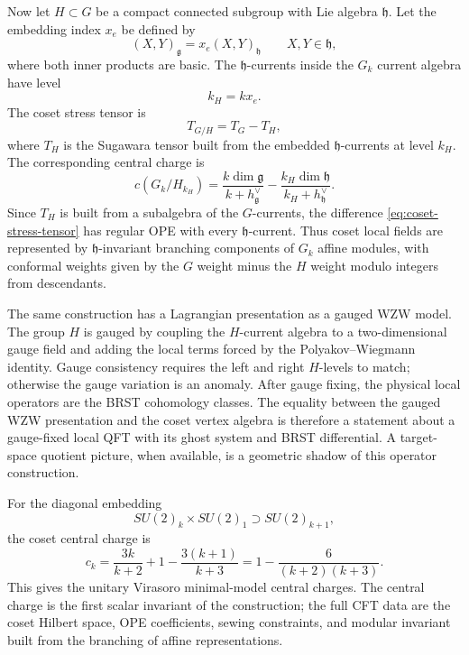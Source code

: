 Now let \(H\subset G\) be a compact connected subgroup with Lie algebra
\(\mathfrak h\).  Let the embedding index \(x_e\) be defined by
\[
  (X,Y)_{\mathfrak g}=x_e(X,Y)_{\mathfrak h}
  \qquad X,Y\in\mathfrak h,
\]
where both inner products are basic.  The \(\mathfrak h\)-currents inside
the \(G_k\) current algebra have level
\[
  k_H=kx_e .
\]
The coset stress tensor is
\begin{equation}
  T_{G/H}
  =
  T_G-T_H,
  \label{eq:coset-stress-tensor}
\end{equation}
where \(T_H\) is the Sugawara tensor built from the embedded
\(\mathfrak h\)-currents at level \(k_H\).  The corresponding central charge
is
\begin{equation}
  c(G_k/H_{k_H})
  =
  \frac{k\dim\mathfrak g}{k+h^\vee_{\mathfrak g}}
  -
  \frac{k_H\dim\mathfrak h}{k_H+h^\vee_{\mathfrak h}} .
  \label{eq:coset-central-charge}
\end{equation}
Since \(T_H\) is built from a subalgebra of the \(G\)-currents, the
difference \eqref{eq:coset-stress-tensor} has regular OPE with every
\(\mathfrak h\)-current.  Thus coset local fields are represented by
\(\mathfrak h\)-invariant branching components of \(G_k\) affine modules,
with conformal weights given by the \(G\) weight minus the \(H\) weight
modulo integers from descendants.

The same construction has a Lagrangian presentation as a gauged WZW model.
The group \(H\) is gauged by coupling the \(H\)-current algebra to a
two-dimensional gauge field and adding the local terms forced by the
Polyakov--Wiegmann identity.  Gauge consistency requires the left and right
\(H\)-levels to match; otherwise the gauge variation is an anomaly.  After
gauge fixing, the physical local operators are the BRST cohomology classes.
The equality between the gauged WZW presentation and the coset vertex
algebra is therefore a statement about a gauge-fixed local QFT with its
ghost system and BRST differential.  A target-space quotient picture, when
available, is a geometric shadow of this operator construction.

For the diagonal embedding
\[
  SU(2)_k\times SU(2)_1\supset SU(2)_{k+1},
\]
the coset central charge is
\begin{equation}
  c_k
  =
  \frac{3k}{k+2}+1-\frac{3(k+1)}{k+3}
  =
  1-\frac{6}{(k+2)(k+3)}.
  \label{eq:su2-minimal-coset-central-charge}
\end{equation}
This gives the unitary Virasoro minimal-model central charges.  The central
charge is the first scalar invariant of the construction; the full CFT data
are the coset Hilbert space, OPE coefficients, sewing constraints, and
modular invariant built from the branching of affine representations.

